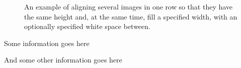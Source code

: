 \documentclass[../template.tex]{subfiles}
\begin{document}
\blindtext


\begin{figure}
	\centering
	\begin{elasticrow}[width=.98\linewidth, sep=1em]
	\end{elasticrow}
	\caption{An example of aligning several images in one row so that they have the same height and, at the same time, fill a specified width, with an optionally specified white space between.}
\end{figure}

\begin{noteblock}
	Some information goes here
	
	And some other information goes here
\end{noteblock}

\blindtext
\end{document}
